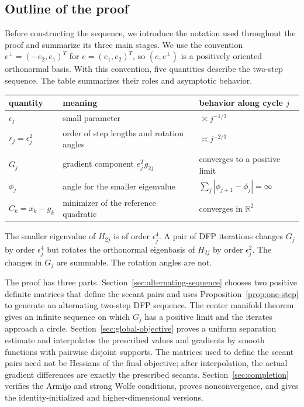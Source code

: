 \documentclass[11pt]{article}
\newcommand{\R}{\mathbb R}
\begin{document}
\subsection{Outline of the proof}

Before constructing the sequence, we introduce the notation used
throughout the proof and summarize its three main stages.  We use the
convention $e^\perp=(-e_2,e_1)^T$ for
$e=(e_1,e_2)^T$, so $(e,e^\perp)$ is a positively oriented orthonormal
basis.  With this convention, five quantities describe the two-step sequence.  The table summarizes their
roles and asymptotic behavior.
\begin{center}

\begin{tabular}{@{}lll@{}}
\toprule
quantity & meaning & behavior along cycle $j$\\
\midrule
$\epsilon_j$ & small parameter & $\asymp j^{-1/3}$\\
$r_j=\epsilon_j^2$ & order of step lengths and rotation angles & $\asymp j^{-2/3}$\\
$G_j$ & gradient component $e_j^Tg_{2j}$ & converges to a positive limit\\
$\phi_j$ & angle for the smaller eigenvalue
  & $\sum_j|\phi_{j+1}-\phi_j|=\infty$\\
$C_k=x_k-g_k$ & minimizer of the reference quadratic & converges in $\R^2$\\
\bottomrule
\end{tabular}
\end{center}
The smaller eigenvalue of $H_{2j}$ is of order $\epsilon_j^4$.  A pair of DFP
iterations changes $G_j$ by order $\epsilon_j^4$ but rotates the orthonormal
eigenbasis of $H_{2j}$ by order $\epsilon_j^2$.  The changes in $G_j$ are
summable.  The rotation angles are not.

The proof has three parts.  Section~\ref{sec:alternating-sequence} chooses two
positive definite matrices that define the secant pairs and uses
Proposition~\ref{prop:one-step} to generate an alternating
two-step DFP sequence.  The center manifold theorem gives an infinite
sequence on which $G_j$ has a positive limit and the iterates approach a
circle.  Section~\ref{sec:global-objective} proves a uniform separation
estimate and interpolates the prescribed values and gradients by
smooth functions with pairwise disjoint supports.  The matrices used to define
the secant pairs need not be Hessians of the final objective; after
interpolation, the actual gradient differences are exactly the prescribed
secants.  Section~\ref{sec:completion} verifies the Armijo and strong Wolfe
conditions, proves nonconvergence, and gives the identity-initialized and
higher-dimensional versions.
\end{document}
